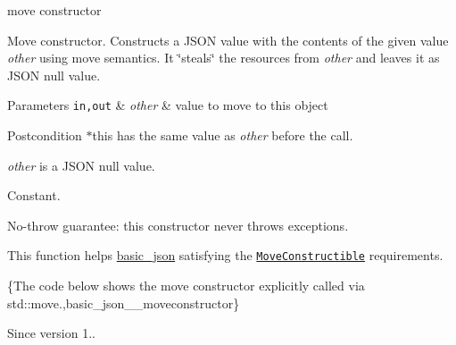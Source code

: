 move constructor 

Move constructor. Constructs a J\+S\+ON value with the contents of the given value {\itshape other} using move semantics. It \char`\"{}steals\char`\"{} the resources from {\itshape other} and leaves it as J\+S\+ON null value.


\begin{DoxyParams}[1]{Parameters}
\mbox{\tt in,out}  & {\em other} & value to move to this object\\
\hline
\end{DoxyParams}
\begin{DoxyPostcond}{Postcondition}
{\ttfamily $\ast$this} has the same value as {\itshape other} before the call. 

{\itshape other} is a J\+S\+ON null value.
\end{DoxyPostcond}
Constant.

No-\/throw guarantee\+: this constructor never throws exceptions.

This function helps {\ttfamily \hyperlink{classnlohmann_1_1basic__json}{basic\+\_\+json}} satisfying the \href{https://en.cppreference.com/w/cpp/named_req/MoveConstructible}{\tt Move\+Constructible} requirements.

\{The code below shows the move constructor explicitly called via std\+::move.,basic\+\_\+json\+\_\+\+\_\+moveconstructor\}

\begin{DoxySince}{Since}
version 1.. 
\end{DoxySince}
